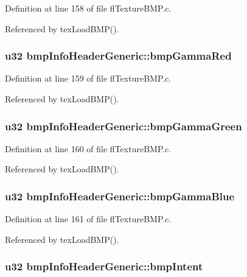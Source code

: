 Definition at line 158 of file fl\-Texture\-BMP.c.

Referenced by tex\-Load\-BMP().
\subsubsection{\setlength{\rightskip}{0pt plus 5cm}u32 {\bf bmp\-Info\-Header\-Generic::bmp\-Gamma\-Red}}\label{structbmpInfoHeaderGeneric_7471a328f81f209ef561008f4acda01e}




Definition at line 159 of file fl\-Texture\-BMP.c.

Referenced by tex\-Load\-BMP().
\subsubsection{\setlength{\rightskip}{0pt plus 5cm}u32 {\bf bmp\-Info\-Header\-Generic::bmp\-Gamma\-Green}}\label{structbmpInfoHeaderGeneric_0a6311798f046c1964852b21917e7a24}




Definition at line 160 of file fl\-Texture\-BMP.c.

Referenced by tex\-Load\-BMP().
\subsubsection{\setlength{\rightskip}{0pt plus 5cm}u32 {\bf bmp\-Info\-Header\-Generic::bmp\-Gamma\-Blue}}\label{structbmpInfoHeaderGeneric_196692717e10ebef837babbdd82e3ea0}




Definition at line 161 of file fl\-Texture\-BMP.c.

Referenced by tex\-Load\-BMP().
\subsubsection{\setlength{\rightskip}{0pt plus 5cm}u32 {\bf bmp\-Info\-Header\-Generic::bmp\-Intent}}\label{structbmpInfoHeaderGeneric_0b16b3a21c977137a3b6aa775aa1374d}




